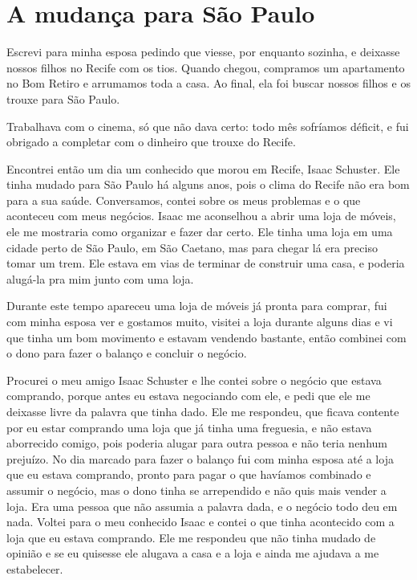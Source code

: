\chapter{A mudança para São Paulo}

Escrevi para minha esposa pedindo que viesse, por enquanto sozinha, e
deixasse nossos filhos no Recife com os tios. Quando chegou, compramos 
um apartamento no Bom Retiro e arrumamos toda a casa. Ao final, ela foi 
buscar nossos filhos e os trouxe para São Paulo.

Trabalhava com o cinema, só que não dava certo: todo mês sofríamos 
déficit, e fui obrigado a completar com o dinheiro que trouxe do Recife.

Encontrei então um dia um conhecido que morou em Recife, Isaac Schuster. 
Ele tinha mudado para São Paulo há alguns anos, pois o clima do 
Recife não era bom para a sua saúde.
Conversamos, contei sobre os meus problemas e o que aconteceu com meus negócios. Isaac me aconselhou a abrir uma loja
de móveis, ele me mostraria como organizar e fazer dar
certo. Ele tinha uma loja em uma cidade perto de São Paulo, em São
Caetano, mas para chegar lá era preciso tomar um trem. Ele estava em vias de terminar de construir uma casa, e poderia alugá-la pra mim junto com uma loja.

Durante este tempo apareceu uma loja de móveis já pronta para comprar,
fui com minha esposa ver e gostamos muito, visitei a loja durante alguns
dias e vi que tinha um bom movimento e estavam vendendo bastante, então
combinei com o dono para fazer o balanço e concluir o negócio.

Procurei o meu amigo Isaac Schuster e lhe contei sobre o negócio que
estava comprando, porque antes eu estava negociando com ele, e pedi que
ele me deixasse livre da palavra que tinha dado. Ele me respondeu, que
ficava contente por eu estar comprando uma loja que já tinha uma
freguesia, e não estava aborrecido comigo, pois poderia alugar para
outra pessoa e não teria nenhum prejuízo. No dia marcado para fazer o
balanço fui com minha esposa até a loja que eu estava comprando, pronto
para pagar o que havíamos combinado e assumir o negócio, mas o dono
tinha se arrependido e não quis mais vender a loja. Era uma pessoa que
não assumia a palavra dada, e o negócio todo deu em nada. Voltei para o
meu conhecido Isaac e contei o que tinha acontecido com a loja que eu
estava comprando. Ele me respondeu que não tinha mudado de opinião e se
eu quisesse ele alugava a casa e a loja e ainda me ajudava a me
estabelecer.


